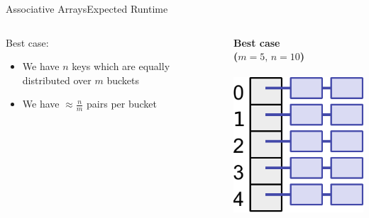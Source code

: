 \begin{frame}{Associative Arrays}{Expected Runtime}
  \begin{columns}
    \begin{column}{0.4\linewidth}
      {\color{Mittel-Blau}Best case}:
      \begin{itemize}
        \item
          We have {\color{Mittel-Blau}$n$} keys which are equally distributed over {\color{Mittel-Blau}$m$} buckets
        \item
          We have {\color{Mittel-Blau}$\approx \frac{n}{m}$} pairs per bucket
      \end{itemize}
    \end{column}
    \begin{column}{0.5\linewidth}
      \begin{center}
        \textbf{Best case}\\
       \textbf{($m = 5, \, n = 10$)}\\
\ \\
        \includegraphics[height=0.4\textheight]{Images/hash-uniform.pdf}

\end{center}
\end{column}
\end{columns}
\end{frame}
